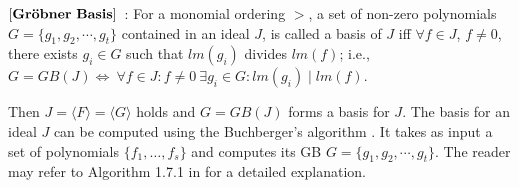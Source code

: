 \begin{Definition}
\label{def:gb}
$\bf{\left[Gr\ddot{o}bner\ Basis\right]}$~\cite{gb_book}: 
For a monomial ordering $>$, a set  of non-zero polynomials $G =
\{g_1,g_2,\cdots,g_t\}$ contained in an ideal $J$, is called a
\Grobner basis of $J$ iff 
$\forall f \in J$, $f\neq 0$, there exists $g_i\in G$ 
such that $lm(g_i)$ divides $lm(f)$; i.e., $G = GB(J)
\Leftrightarrow\  \forall f \in J : f \neq 0 \ \exists g_i \in G :
lm(g_i)\mid lm(f)$.  
\end{Definition}

Then $J = \langle F \rangle = \langle G \rangle$ holds and $G=GB(J)$
forms a basis for $J$. The \Grobner basis for an ideal $J$ can be
computed using the  Buchberger's algorithm \cite{buchberger_thesis}. 
It takes as input a set of polynomials $\{f_1,\dots, f_s\}$ and
computes its GB $G = \{g_1,g_2,\cdots,g_t\}$. The reader may refer to Algorithm 1.7.1 in \cite{gb_book} for a detailed explanation.

